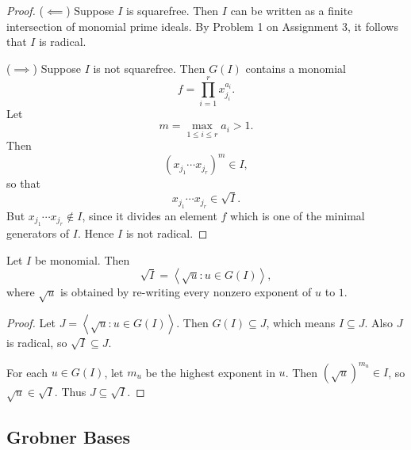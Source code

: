 \documentclass[co439]{subfiles}
\begin{document}
    \begin{proof}
        ($\impliedby$) Suppose $I$ is squarefree. Then $I$ can be written as a finite intersection of monomial prime ideals. By Problem 1 on Assignment 3, it follows that $I$ is radical.

        ($\implies$) Suppose $I$ is not squarefree. Then $G\left( I \right)$ contains a monomial
        \begin{equation*}
            f = \prod^{r}_{i=1} x_{j_i}^{a_i}.
        \end{equation*}
        Let
        \begin{equation*}
            m = \max_{1\leq i\leq r} a_i > 1.
        \end{equation*}
        Then
        \begin{equation*}
            \left( x_{j_1}\cdots x_{j_r} \right)^m \in I,
        \end{equation*}
        so that
        \begin{equation*}
            x_{j_1}\cdots x_{j_r}\in\sqrt{I}.
        \end{equation*}
        But $x_{j_1}\cdots x_{j_r}\notin I$, since it divides an element $f$ which is one of the minimal generators of $I$. Hence $I$ is not radical.
    \end{proof}
    
    \begin{theorem}{}
        Let $I$ be monomial. Then
        \begin{equation*}
            \sqrt{I} = \left< \sqrt{u}:u\in G\left( I \right) \right>, 
        \end{equation*}
        where $\sqrt{u}$ is obtained by re-writing every nonzero exponent of $u$ to $1$.
    \end{theorem}

    \begin{proof}
        Let $J = \left< \sqrt{u}: u\in G\left( I \right) \right>$. Then $G\left( I \right)\subseteq J$, which means $I\subseteq J$. Also $J$ is radical, so $\sqrt{I}\subseteq J$.

        For each $u\in G\left( I \right)$, let $m_u$ be the highest exponent in $u$. Then $\left( \sqrt{u} \right)^{m_u}\in I$, so $\sqrt{u}\in\sqrt{I}$. Thus $J\subseteq\sqrt{I}$.
    \end{proof}
    
    \subsection{Grobner Bases}
\end{document}
